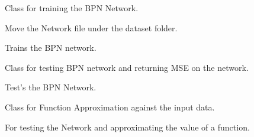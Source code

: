 \documentclass[letterpaper,10pt,english]{sphinxmanual}
\begin{document}
\begin{fulllineitems}
\label{index:train.bpn}
Class for training the BPN Network.


\begin{fulllineitems}
\label{index:train.bpn.move_network_file}
Move the Network file under the dataset folder.

\end{fulllineitems}



\begin{fulllineitems}
\label{index:train.bpn.train}
Trains the BPN network.

\end{fulllineitems}


\end{fulllineitems}

\label{index:module-test}

\begin{fulllineitems}
\label{index:test.bpn_test}
Class for testing BPN network and returning MSE on the network.


\begin{fulllineitems}
\label{index:test.bpn_test.test}
Test's the BPN Network.

\end{fulllineitems}


\end{fulllineitems}

\label{index:module-fapprox}

\begin{fulllineitems}
\label{index:fapprox.function_aprox}
Class for Function Approximation against the input data.


\begin{fulllineitems}
\label{index:fapprox.function_aprox.test}
For testing the Network and approximating the value of a function.

\end{fulllineitems}


\end{fulllineitems}
\end{document}
